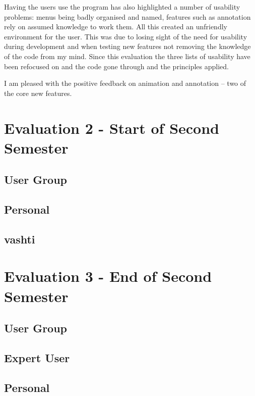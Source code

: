 Having the users use the program has also highlighted a number of usability problems: menus being badly organised and named, features such as annotation rely on assumed knowledge to work them.  All this created an unfriendly environment for the user.  This was due to losing sight of the need for usability during development and when testing new features not removing the knowledge of the code from my mind.  Since this evaluation the three lists of usability have been refocused on and the code gone through and the principles applied.

I am pleased with the positive feedback on animation and annotation -- two of the core new features.

\section{Evaluation 2 - Start of Second Semester}
\subsection{User Group}


\subsection{Personal}

\subsection{vashti}


\section{Evaluation 3 - End of Second Semester}
\subsection{User Group}
\subsection{Expert User}



\subsection{Personal}

